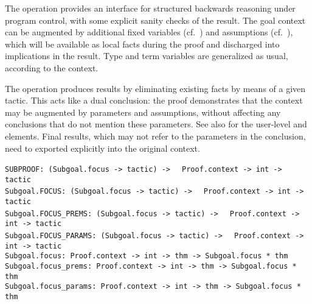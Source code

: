 \begin{isabellebody}
\begin{isamarkuptext}
  The  operation provides an interface for structured
  backwards reasoning under program control, with some explicit sanity
  checks of the result.  The goal context can be augmented by
  additional fixed variables (cf.\ ) and
  assumptions (cf.\ ), which will be available
  as local facts during the proof and discharged into implications in
  the result.  Type and term variables are generalized as usual,
  according to the context.

  The  operation produces results by eliminating
  existing facts by means of a given tactic.  This acts like a dual
  conclusion: the proof demonstrates that the context may be augmented
  by parameters and assumptions, without affecting any conclusions
  that do not mention these parameters.  See also
  \cite{isabelle-isar-ref} for the user-level \hyperlink{command.obtain}{\mbox{}} and
  \hyperlink{command.guess}{\mbox{}} elements.  Final results, which may not refer to
  the parameters in the conclusion, need to exported explicitly into
  the original context.%
\end{isamarkuptext}%
\isamarkuptrue%
%
\isadelimmlref
%
\endisadelimmlref
%
\isatagmlref
%
\begin{isamarkuptext}%
\begin{mldecls}
  \verb|SUBPROOF: (Subgoal.focus -> tactic) ->|\isasep\isanewline%
\verb|  Proof.context -> int -> tactic| \\
  \verb|Subgoal.FOCUS: (Subgoal.focus -> tactic) ->|\isasep\isanewline%
\verb|  Proof.context -> int -> tactic| \\
  \verb|Subgoal.FOCUS_PREMS: (Subgoal.focus -> tactic) ->|\isasep\isanewline%
\verb|  Proof.context -> int -> tactic| \\
  \verb|Subgoal.FOCUS_PARAMS: (Subgoal.focus -> tactic) ->|\isasep\isanewline%
\verb|  Proof.context -> int -> tactic| \\
  \verb|Subgoal.focus: Proof.context -> int -> thm -> Subgoal.focus * thm| \\
  \verb|Subgoal.focus_prems: Proof.context -> int -> thm -> Subgoal.focus * thm| \\
  \verb|Subgoal.focus_params: Proof.context -> int -> thm -> Subgoal.focus * thm| \\
  \end{mldecls}


\end{isamarkuptext}
\end{isabellebody}
